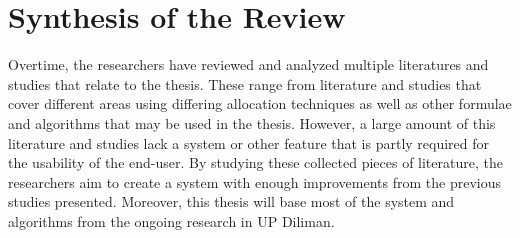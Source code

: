 \section{Synthesis of the Review}

Overtime, the researchers have reviewed and analyzed multiple literatures and studies that relate to the thesis. These range from literature and studies that cover different areas using differing allocation techniques as well as other formulae and algorithms that may be used in the thesis. However, a large amount of this literature and studies lack a system or other feature that is partly required for the usability of the end-user. By studying these collected pieces of literature, the researchers aim to create a system with enough improvements from the previous studies presented. Moreover, this thesis will base most of the system and algorithms from the ongoing research in UP Diliman. 